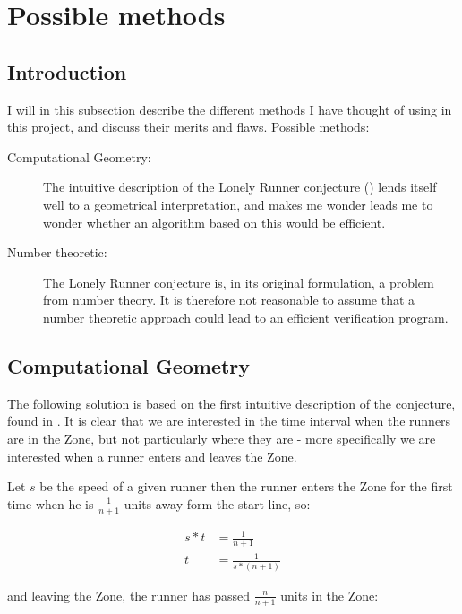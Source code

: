 \section{Possible methods}
\label{choiceOfMethod}

\subsection{Introduction}
I will in this subsection describe the different methods I have thought of using in this project, and discuss their merits and flaws.
Possible methods:

\begin{description}
\item[Computational Geometry:] The intuitive description of the Lonely Runner conjecture () lends itself well to a geometrical interpretation, and makes me wonder  leads me to wonder whether an algorithm based on this would be efficient.

\item[Number theoretic:] The Lonely Runner conjecture is, in its original formulation, a problem from number theory. It is therefore not reasonable to assume that a number theoretic approach could lead to an efficient verification program.
\end{description}

\subsection{Computational Geometry}
\label{compGeo}
The following solution is based on the first intuitive description of the conjecture, found in . It is clear that we are interested in the time interval when the runners are in the Zone, but not particularly where they are - more specifically we are interested when a runner enters and leaves the Zone. 

Let $s$ be the speed of a given runner then the runner enters the Zone for the first time when he is $\frac{1}{n+1}$ units away form the start line, so: 

\begin{equation}
\label{eqa:speedOne}
\begin{split}
s * t &= \frac{1}{n+1} \\
t &= \frac{1}{s * (n+1)}
\end{split}
\end{equation}

and leaving the Zone, the runner has passed $\frac{n}{n+1}$ units in the Zone:

